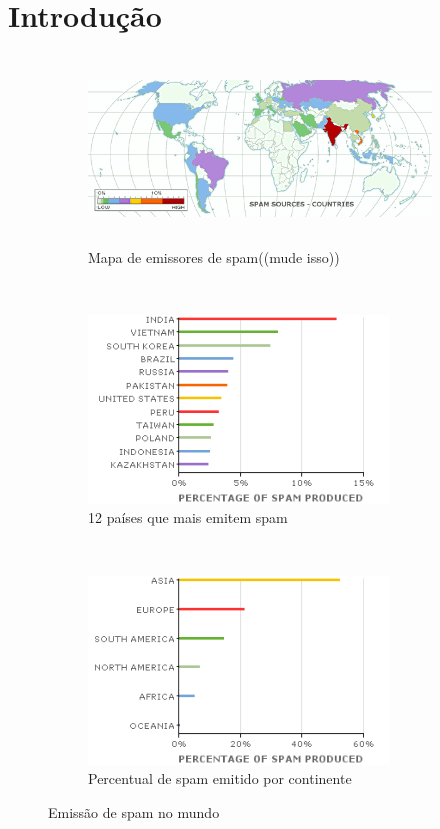 \documentclass[a4paper,dvipdfm]{article}
\begin{document}
\section{Introdução}
	\begin{figure}[ht]
		\begin{subfigure}[b]{\textwidth}
			\centering
			\includegraphics[height=5cm]{Imagens/m86security/spam-country-map.png}
			\caption{Mapa de emissores de spam((mude isso))}
		\end{subfigure}
		~
		\begin{subfigure}[b]{0.47\textwidth}
			\centering
			\includegraphics[height=5cm]{Imagens/m86security/spam-country-bar.png}
			\caption{12 países que mais emitem spam}
		\end{subfigure}
		~
		\begin{subfigure}[b]{0.47\textwidth}
			\centering
			\includegraphics[height=5cm]{Imagens/m86security/spam-continent-bar.png}
			\caption{Percentual de spam emitido por continente}
		\end{subfigure}
		\caption{Emissão de spam no mundo}
		\label{fig:spamworld}
	\end{figure}
\end{document}
